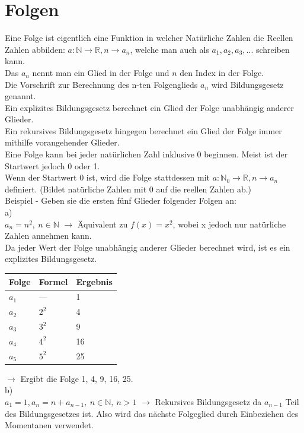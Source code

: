 \documentclass{article}
\newcommand{\N}{\mathbb{N}}
\newcommand{\R}{\mathbb{R}}
\begin{document}
	\section{Folgen}
	Eine Folge ist eigentlich eine Funktion in welcher Natürliche Zahlen die Reellen Zahlen abbilden: $a:\N \rightarrow\R, n \rightarrow a_n$, welche man auch als $a_1, a_2, a_3,...$ schreiben kann. \\
	Das $a_n$ nennt man ein Glied in der Folge und $n$ den Index in der Folge. \\
	Die Vorschrift zur Berechnung des n-ten Folgenglieds $a_n$ wird Bildungsgesetz genannt. \\
	Ein explizites Bildungsgesetz berechnet ein Glied der Folge unabhängig anderer Glieder. \\
	Ein rekursives Bildungsgesetz hingegen berechnet ein Glied der Folge immer mithilfe vorangehender Glieder.  \\
	Eine Folge kann bei jeder natürlichen Zahl inklusive 0 beginnen. Meist ist der Startwert jedoch 0 oder 1. \\ 
	Wenn der Startwert 0 ist, wird die Folge stattdessen mit $a:\N_0 \rightarrow\R, n \rightarrow a_n$ definiert. (Bildet natürliche Zahlen mit 0 auf die reellen Zahlen ab.) \\
	Beispiel - Geben sie die ersten fünf Glieder folgender Folgen an: \\
	a)\\
	$a_n = n^2,\ n\in\N$ $\to$ Äquivalent zu $f(x)=x^2$, wobei x jedoch nur natürliche Zahlen annehmen kann.\\ 
	Da jeder Wert der Folge unabhängig anderer Glieder berechnet wird, ist es ein explizites Bildungsgesetz. \\
	\begin{tabular}{| l | l | l |}
		\toprule
		Folge & Formel & Ergebnis \\ \midrule
		$a_1$ & --- & 1 \\
		$a_2$ & $2^2$ & 4 \\
		$a_3$ & $3^2$ & 9 \\
		$a_4$ & $4^2$ & 16 \\
		$a_5$ & $5^2$ & 25 \\
		\bottomrule
	\end{tabular}
	$\to$ Ergibt die Folge 1, 4, 9, 16, 25. \vspace{2cm} \\ 
	b) \\
	$a_1=1, a_n=n+a_{n-1},\ n\in\N,\ n>1$ $\to$ Rekursives Bildungsgesetz da $a_{n-1}$ Teil des Bildungsgesetzes ist. Also wird das nächste Folgeglied durch Einbeziehen des Momentanen verwendet. \\
\end{document}
